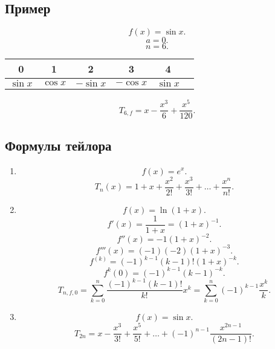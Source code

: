 \documentclass[a4paper]{scrartcl}
\begin{document}
\subsection{Пример}
\[
    f(x) = \sin{x}
.\] 
\[
a = 0
.\] 
\[
n = 6
.\] 
\begin{center}
    \begin{tabular}{|c|c|c|c|c|c|}
        \hline
        0 & 1 & 2 & 3 &4\\
        \hline
        $\sin{x}$ &  $\cos{x}$ &  $-\sin{x}$ &  $-\cos{x}$ & $\sin{x}$\\
        \hline
    \end{tabular}
\end{center}
\[
    T_{6,f} = x - \frac{x^3}{6} + \frac{x^5}{120}
.\] 
\subsection{Формулы тейлора}
\begin{enumerate}
    \item
    \[
        f(x) = e^x
    .\] 
    \[
        T_n(x) = 1 + x + \frac{x^2}{2!} + \frac{x^3}{3!} + \dots + \frac{x^n}{n!}
    .\] 
    \item
        \[
            f(x) = \ln{(1 + x)}
        .\] 
        \[
            f'(x) = \frac{1}{1 + x} = (1 + x)^{-1}
        .\] 
        \[
            f''(x) =  -1(1 + x)^{-2}
        .\] 
        \[
            f'''(x) = (-1)(-2)(1 + x)^{-3}
        .\] 
        \[
            f^{(k)} = (-1)^{k - 1} (k - 1)!(1 + x)^{-k}
        .\] 
        \[
            f^{k}(0) = (-1 )^{k - 1}(k - 1)^{-k}
        .\] 
        \[
            T_{n,f,0} = \sum_{k = 0}^{n} \frac{(-1)^{k-1} (k - 1)!}{k!} x^k = \sum_{k=0}^{n} (-1)^{k - 1} \frac{x^k}{k}
        .\] 
        \item
            \[
                f(x) = \sin{x}
            .\] 
            \[
                T_{2n} = x - \frac{x^3}{3!}  + \frac{x^5}{5!} + \dots + (-1)^{n - 1} \frac{x^{2n - 1}}{(2n - 1)!}
            .\] 
\end{enumerate}
\end{document}
